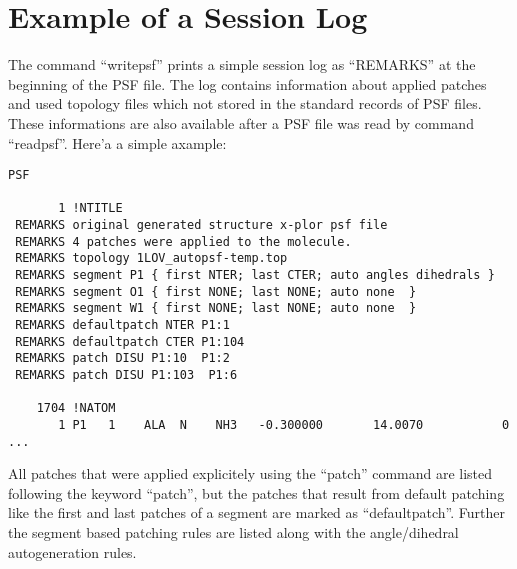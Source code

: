 \section{Example of a Session Log}
The command  ``writepsf'' prints a simple session log as ``REMARKS'' 
at the beginning of the PSF file. The log contains information about applied patches 
and used topology files which not stored in the standard records of PSF files.
These informations are also available after a PSF file was read by command ``readpsf''.
Here'a a simple axample:

\begin{verbatim}
PSF

       1 !NTITLE
 REMARKS original generated structure x-plor psf file
 REMARKS 4 patches were applied to the molecule.
 REMARKS topology 1LOV_autopsf-temp.top
 REMARKS segment P1 { first NTER; last CTER; auto angles dihedrals }
 REMARKS segment O1 { first NONE; last NONE; auto none  }
 REMARKS segment W1 { first NONE; last NONE; auto none  }
 REMARKS defaultpatch NTER P1:1
 REMARKS defaultpatch CTER P1:104
 REMARKS patch DISU P1:10  P1:2
 REMARKS patch DISU P1:103  P1:6

    1704 !NATOM
       1 P1   1    ALA  N    NH3   -0.300000       14.0070           0
...
\end{verbatim}

All patches that were applied explicitely using the ``patch'' command are 
listed following the keyword  ``patch'', but the patches that
result from default patching like the first and last patches of a segment 
are marked as ``defaultpatch''. Further the segment based patching rules are
listed along with the angle/dihedral autogeneration rules.
